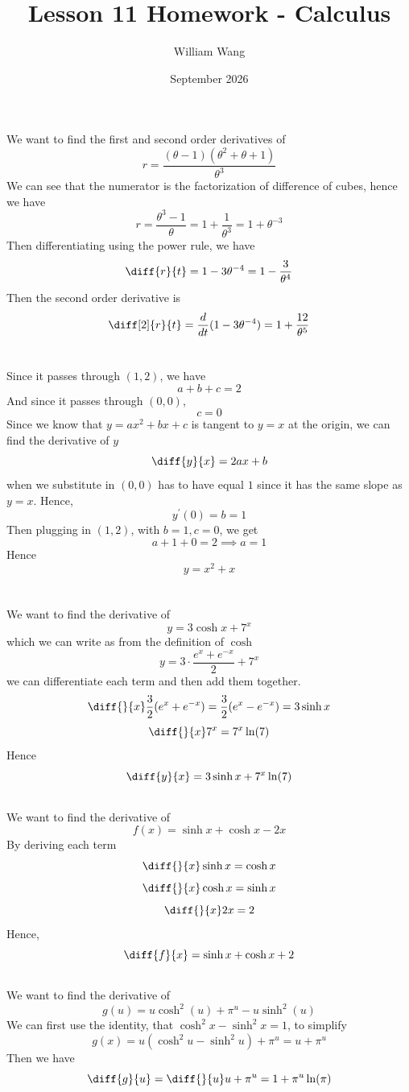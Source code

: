\documentclass{article}
\title{Lesson 11 Homework - Calculus}
\author{William Wang}
\date{September 2026}
\begin{document}
\maketitle

\section{}
We want to find the first and second order derivatives of 
\[r = \frac{(\theta - 1)(\theta^2+\theta+1)}{\theta^3}\]
We can see that the numerator is the factorization of difference of cubes, hence we have 
\[r = \frac{\theta^3 - 1}{\theta} = 1+ \frac{1}{\theta^3} = 1+ \theta^{-3}\]
Then differentiating using the power rule, we have
\[\diff{r}{t} = 1 -3\theta^{-4} = 1 - \frac{3}{\theta^4}\]
Then the second order derivative is 
\[\diff[2]{r}{t} = \frac{d}{dt} (1-3\theta^{-4}) = 1 +\frac{12}{\theta^5}\]

\section{}
Since it passes through \((1,2)\), we have 
\[a+b+c = 2 \]
And since it passes through \((0,0)\), 
\[c = 0\]
Since we know that \(y = ax^2 +bx+c\) is tangent to \(y=x\) at the origin, we can find the derivative of \(y\)
\[\diff{y}{x} = 2ax + b\]
when we substitute in \((0,0)\) has to have equal \(1\) since it has the same slope as \(y=x\). Hence,
\[y^\prime(0) =b = 1\]
Then plugging in \((1,2)\), with \(b= 1, c = 0\), we get 
\[a + 1 + 0 = 2 \implies a = 1\]
Hence
\[y = x^2+x\]

\section{}
\subsection{}
We want to find the derivative of 
\[y = 3\cosh x + 7^x\]
which we can write as from the definition of \(\cosh\)
\[y = 3\cdot\frac{e^x+e^{-x}}{2} + 7^x\]
we can differentiate each term and then add them together. 
\[\diff{}{x} \frac{3}{2}(e^x+e^{-x}) = \frac{3}{2} (e^x - e^{-x}) =  3\sinh x\]
\[\diff{}{x} 7^x = 7^x \ln(7)\]
Hence
\[\diff{y}{x} = 3\sinh x + 7^x\ln(7)\]
\subsection{}
We want to find the derivative of 
\[f(x) = \sinh x + \cosh x - 2x\]
By deriving each term
\[\diff{}{x} \sinh x = \cosh x\]
\[\diff{}{x} \cosh x = \sinh x\]
\[\diff{}{x} 2x = 2\]
Hence,
\[\diff{f}{x} = \sinh x + \cosh x + 2\]
\subsection{}
We want to find the derivative of 
\[g(u) = u \cosh^2(u) + \pi^u - u\sinh^2(u)\]
We can first use the identity, that \(\cosh^2 x - \sinh^2 x =1\), to simplify
\[g(x) = u(\cosh^2 u - \sinh^2 u) + \pi^u = u + \pi^u\]
Then we have 
\[\diff{g}{u} = \diff{}{u} u + \pi^u = 1 + \pi^u \ln(\pi)\]
\end{document}
